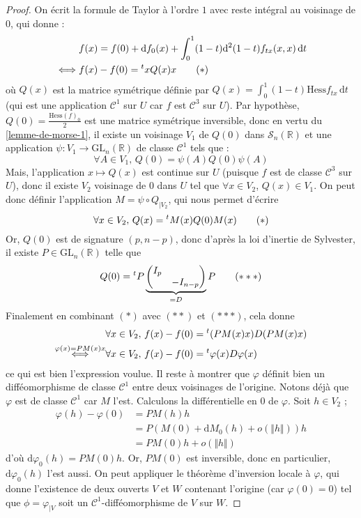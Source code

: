  \begin{proof}
    On écrit la formule de Taylor à l'ordre $1$ avec reste intégral au voisinage de $0$, qui donne :
    \begin{align*}
      &f(x) = f(0) + \mathrm{d} f_0(x) + \int_0^1 (1-t) \mathrm{d}^2 (1-t) f_{tx} (x, x) \, \mathrm{d}t \\
      \iff& f(x) - f(0) = \mathstrut ^t x Q(x) x \tag{$*$}
    \end{align*}
    où $Q(x)$ est la matrice symétrique définie par $Q(x) = \int_0^1 (1-t) \mathrm{Hess} f_{tx} \, \mathrm{d}t$ (qui est une application $\mathcal{C}^1$ sur $U$ car $f$ est $\mathcal{C}^3$ sur $U$).
    \newpar
    Par hypothèse, $Q(0) = \frac{\mathrm{Hess} (f)_0}{2}$ est une matrice symétrique inversible, donc en vertu du \cref{lemme-de-morse-1}, il existe un voisinage $V_1$ de $Q(0)$ dans $\mathcal{S}_n(\mathbb{R})$ et une application $\psi : V_1 \rightarrow \mathrm{GL}_n(\mathbb{R})$ de classe $\mathcal{C}^1$ tels que :
    \[ \forall A \in V_1, \, Q(0) = \psi(A) Q(0) \psi(A) \]
    Mais, l'application $x \mapsto Q(x)$ est continue sur $U$ (puisque $f$ est de classe $\mathcal{C}^3$ sur $U$), donc il existe $V_2$ voisinage de $0$ dans $U$ tel que $\forall x \in V_2$, $Q(x) \in V_1$. On peut donc définir l'application $M = \psi \circ Q_{|V_2}$, qui nous permet d'écrire
    \[ \forall x \in V_2, \, Q(x) = \mathstrut ^t M (x) Q(0) M (x) \tag{$*$} \]
    Or, $Q(0)$ est de signature $(p, n-p)$, donc d'après la loi d'inertie de Sylvester, il existe $P \in \mathrm{GL}_n(\mathbb{R})$ telle que
    \[ Q(0) = \mathstrut ^t P \underbrace{\begin{pmatrix} I_p & \\ & - I_{n-p} \end{pmatrix}}_{= D} P \tag{$***$} \]
    Finalement en combinant $(*)$ avec $(**)$ et $(***)$, cela donne
    \begin{align*}
      &\forall x \in V_2, \, f(x) - f(0) = \mathstrut ^t (P M(x) x) D (P M(x) x) \\
      \overset{\varphi(x) = P M(x) x}{\iff}& \forall x \in V_2, \, f(x) - f(0) = \mathstrut ^t \varphi(x) D \varphi(x)
    \end{align*}
    ce qui est bien l'expression voulue.
    \newpar
    Il reste à montrer que $\varphi$ définit bien un difféomorphisme de classe $\mathcal{C}^1$ entre deux voisinages de l'origine. Notons déjà que $\varphi$ est de classe $\mathcal{C}^1$ car $M$ l'est. Calculons la différentielle en $0$ de $\varphi$. Soit $h \in V_2$ ;
    \begin{align*}
      \varphi(h) - \varphi(0) &= P M(h) h \\
      &= P( M(0) + \mathrm{d} M_0 (h) + o(\Vert h \Vert))h \\
      &= P M(0) h + o(\Vert h \Vert)
    \end{align*}
    d'où $\mathrm{d} \varphi_0 (h) = P M(0) h$. Or, $P M(0)$ est inversible, donc en particulier, $\mathrm{d} \varphi_0 (h)$ l'est aussi. On peut appliquer le théorème d'inversion locale à $\varphi$, qui donne l'existence de deux ouverts $V$ et $W$ contenant l'origine (car $\varphi(0) = 0$) tel que $\phi = \varphi_{|V}$ soit un $\mathcal{C}^1$-difféomorphisme de $V$ sur $W$.
  \end{proof}

